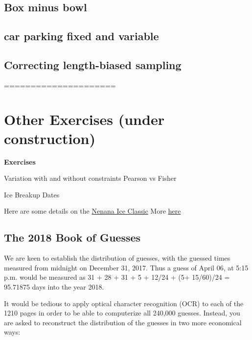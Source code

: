 \documentclass[]{book}
\begin{document}
\hypertarget{box-minus-bowl}{%
\subsection{Box minus bowl}\label{box-minus-bowl}}

\hypertarget{car-parking-fixed-and-variable}{%
\subsection{car parking fixed and variable}\label{car-parking-fixed-and-variable}}

\hypertarget{correcting-length-biased-sampling}{%
\subsection{Correcting length-biased sampling}\label{correcting-length-biased-sampling}}

=====================

\hypertarget{other-exercises-under-construction-1}{%
\section{Other Exercises (under construction)}\label{other-exercises-under-construction-1}}

\textbf{Exercises}

Variation with and without constraints Pearson vs Fisher

Ice Breakup Dates

Here are some details on the
\href{http://www.nenanaakiceclassic.com}{Nenana Ice Classic}
More \href{http://www.john-daly.com/nenana.htm}{here}

\hypertarget{the-2018-book-of-guesses-1}{%
\subsection{The 2018 Book of Guesses}\label{the-2018-book-of-guesses-1}}

We are keen to establish the distribution of guesses, with the guessed times measured from midnight on December 31, 2017. Thus a guess of April 06, at 5:15 p.m. would be measured as 31 + 28 + 31 + 5 + 12/24 + (5+ 15/60)/24 = 95.71875 days into the year 2018.

It would be tedious to apply optical character recognition (OCR) to each of the 1210 pages in order to be able to computerize all 240,000 guesses. Instead, you are asked to reconstruct the distribution of the guesses in two more economical ways:
\end{document}
